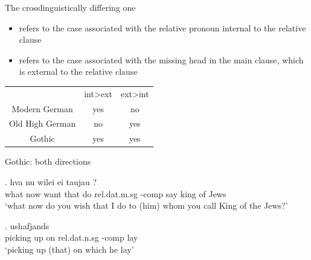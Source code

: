 \documentclass[12pt]{beamer}
\newcommand*{\mybox}[1]{\framebox{#1}} %
\begin{document}
\begin{frame}{The crosslinguistically differing one}

\begin{itemize}
  \item {} refers to the case associated with the relative pronoun internal to the relative clause
  \item {} refers to the case associated with the missing head in the main clause, which is external to the relative clause
\end{itemize}

\pause

\begin{table}[h]
	\center
		\begin{tabular}{ccc}
		\toprule
		 					      & \ac{int}>\ac{ext}		& \ac{ext}>\ac{int}	\\
								      \cmidrule{2-3}
		Modern German 	& yes			 						&	no								\\
		Old High German	& no									&	yes								\\
		Gothic		      &	yes									&	yes								\\
		\bottomrule
		\end{tabular}
\end{table}

\end{frame}


\begin{frame}{Gothic: both directions}

\exg. hva nu wilei ei taujau \mybox{þamm}    ?\\
 what now want that do\scsub{[dat]} \ac{rel}.\ac{dat}.\ac{m}.\ac{sg} -\ac{comp} say\scsub{[acc]} king {of Jews}\\
 `what now do you wish that I do to (him) whom you call King of the Jews?' \label{ex:gothic-dat-acc-rep}

\exg. ushafjands  \mybox{\tbf{þamm}}  \\
{picking up}\scsub{[acc]} on\scsub{[dat]} \ac{rel}.\ac{dat}.\ac{n}.\ac{sg} -\ac{comp} lay\\
`picking up (that) on which he lay' \label{ex:gothic-acc-dat-rep}

\end{frame}
\end{document}
